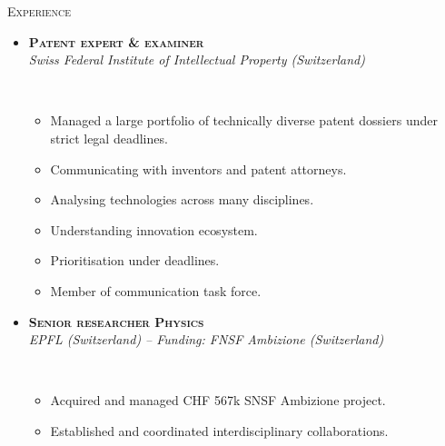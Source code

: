 \documentclass[11pt, a4paper]{article}
\newcommand{\dates}[1]{\hfill\mbox{\textbf{#1}}} %
\newcommand{\smaller}[1]{{\small\ #1}}
\newcommand{\headright}[1]{
    \vspace*{1.5ex}\textsc{\Large\color{cvblue}#1}\par%
    \vspace*{-2ex}{\color{cvblue}\hrulefill}\par
}
\begin{document}
\begin{minipage}[t]{0.56\textwidth}
    \hypersetup{urlcolor = cvblue, linkcolor = cvblue}

    \setlength{\parskip}{0.8ex}%

    \vspace{2ex}

    \headright{Experience}

    \begin{itemize}
        \item
        \textbf{\textsc{Patent expert \& examiner}} \dates{\MyDateIPI}
        \vspace*{0.1eM}
        \\
        \textit{Swiss Federal Institute of Intellectual Property (Switzerland)}
        \vspace*{0.2eM}
        \smaller{%
            \begin{itemize}
                \item Managed a large portfolio of technically diverse patent dossiers under strict legal deadlines.
                \item Communicating with inventors and patent attorneys.
                \item Analysing technologies across many disciplines.
                \item Understanding innovation ecosystem.
                \item Prioritisation under deadlines.
                \item Member of communication task force.
            \end{itemize}
        }
        \vspace*{0.2eM}
        \item
        \textbf{\textsc{Senior researcher Physics}} \dates{\MyDateAmbizione}
        \vspace*{0.1eM}
        \\
        \textit{EPFL (Switzerland) -- Funding: FNSF Ambizione (Switzerland)}
        \vspace*{0.2eM}
        \smaller{%
            \begin{itemize}
                \item Acquired and managed CHF 567k SNSF Ambizione project.
                \item Established and coordinated interdisciplinary collaborations.

\end{itemize}}
\end{itemize}
\end{minipage}
\end{document}
